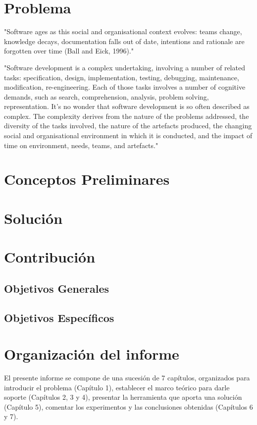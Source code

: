 \section{Problema}

"Software ages as this social and organisational context evolves: teams change,
knowledge decays, documentation falls out of date, intentions and rationale are forgotten over time
(Ball and Eick, 1996)."

"Software development is a complex undertaking, involving a number of related tasks: specification,
design, implementation, testing, debugging, maintenance, modification, re-engineering. Each of those
tasks involves a number of cognitive demands, such as search, comprehension, analysis, problem
solving, representation. It’s no wonder that software development is so often described as complex.
The complexity derives from the nature of the problems addressed, the diversity of the tasks involved,
the nature of the artefacts produced, the changing social and organisational environment in which it is
conducted, and the impact of time on environment, needs, teams, and artefacts."\cite{PetreDeQuency06}

\section{Conceptos Preliminares}

\section{Solución}

\section{Contribución}
\subsection{Objetivos Generales}
\subsection{Objetivos Específicos}

\section{Organización del informe}
El presente informe se compone de una sucesión de 7 capítulos, organizados para introducir
el problema (Capítulo 1), establecer el marco teórico para darle soporte (Capítulos 2, 3 y 4),
presentar la herramienta que aporta una solución (Capítulo 5), comentar los experimentos y
las conclusiones obtenidas (Capítulos 6 y 7).

